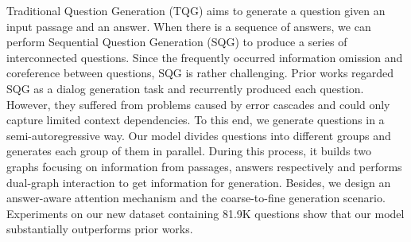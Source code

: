 Traditional Question Generation (TQG) aims to generate a question given an input passage and an answer. When there is a sequence of answers, we can perform Sequential Question Generation (SQG) to produce a series of interconnected questions. Since the frequently occurred information omission and coreference between questions, SQG is rather challenging. Prior works regarded SQG as a dialog generation task and recurrently produced each question. However, they suffered from problems caused by error cascades and could only capture limited context dependencies. To this end, we generate questions in a semi-autoregressive way. Our model divides questions into different groups and generates each group of them in parallel. During this process, it builds two graphs focusing on information from passages, answers respectively and performs dual-graph interaction to get information for generation. Besides, we design an answer-aware attention mechanism and the coarse-to-fine generation scenario. Experiments on our new dataset containing 81.9K questions show that our model substantially outperforms prior works.
